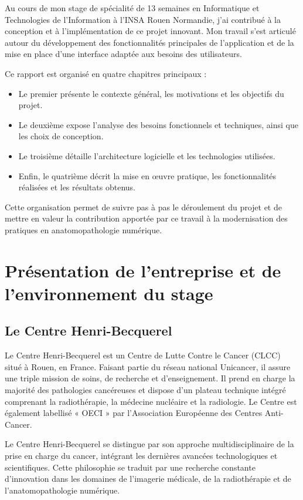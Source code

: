 \documentclass[12pt,a4paper]{report}
\begin{document}
Au cours de mon stage de spécialité de 13 semaines en Informatique et Technologies de l'Information à l'INSA Rouen Normandie, j'ai contribué à la conception et à l'implémentation de ce projet innovant. Mon travail s'est articulé autour du développement des fonctionnalités principales de l'application et de la mise en place d'une interface adaptée aux besoins des utilisateurs.

Ce rapport est organisé en quatre chapitres principaux :
\begin{itemize}
\item Le premier présente le contexte général, les motivations et les objectifs du projet.
\item Le deuxième expose l'analyse des besoins fonctionnels et techniques, ainsi que les choix de conception.
\item Le troisième détaille l'architecture logicielle et les technologies utilisées.
\item Enfin, le quatrième décrit la mise en œuvre pratique, les fonctionnalités réalisées et les résultats obtenus.
\end{itemize}

Cette organisation permet de suivre pas à pas le déroulement du projet et de mettre en valeur la contribution apportée par ce travail à la modernisation des pratiques en anatomopathologie numérique.

\chapter{Présentation de l'entreprise et de l'environnement du stage}

\section{Le Centre Henri-Becquerel}

Le Centre Henri-Becquerel est un Centre de Lutte Contre le Cancer (CLCC) situé à Rouen, en France. Faisant partie du réseau national Unicancer, il assure une triple mission de soins, de recherche et d'enseignement. Il prend en charge la majorité des pathologies cancéreuses et dispose d'un plateau technique intégré comprenant la radiothérapie, la médecine nucléaire et la radiologie. Le Centre est également labellisé « OECI » par l'Association Européenne des Centres Anti-Cancer.

Le Centre Henri-Becquerel se distingue par son approche multidisciplinaire de la prise en charge du cancer, intégrant les dernières avancées technologiques et scientifiques. Cette philosophie se traduit par une recherche constante d'innovation dans les domaines de l'imagerie médicale, de la radiothérapie et de l'anatomopathologie numérique.
\end{document}
